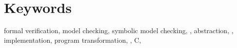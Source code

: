 \begingroup
\let\clearpage\relax
\let\cleardoublepage\relax
\let\cleardoublepage\relax

\chapter*{Keywords}
formal verification, model checking, symbolic model checking, \DIVINE,
abstraction, \LLVM, implementation, program transformation, \LART, C, \Cpp
\endgroup


